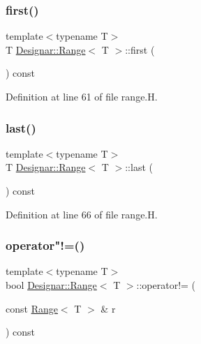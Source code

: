 \subsubsection{\texorpdfstring{first()}{first()}}
{\footnotesize\ttfamily template$<$typename T$>$ \\
T \hyperlink{class_designar_1_1_range}{Designar\+::\+Range}$<$ T $>$\+::first (\begin{DoxyParamCaption}{ }\end{DoxyParamCaption}) const\hspace{0.3cm}{\ttfamily [inline]}}



Definition at line 61 of file range.\+H.

\mbox{\label{class_designar_1_1_range_abe2839675b48ab64073c2e74976523c7}} 
\subsubsection{\texorpdfstring{last()}{last()}}
{\footnotesize\ttfamily template$<$typename T$>$ \\
T \hyperlink{class_designar_1_1_range}{Designar\+::\+Range}$<$ T $>$\+::last (\begin{DoxyParamCaption}{ }\end{DoxyParamCaption}) const\hspace{0.3cm}{\ttfamily [inline]}}



Definition at line 66 of file range.\+H.

\mbox{\label{class_designar_1_1_range_a736b540580449acc24fd57d4fa51897e}} 
\subsubsection{\texorpdfstring{operator"!=()}{operator!=()}}
{\footnotesize\ttfamily template$<$typename T$>$ \\
bool \hyperlink{class_designar_1_1_range}{Designar\+::\+Range}$<$ T $>$\+::operator!= (\begin{DoxyParamCaption}\item[{const \hyperlink{class_designar_1_1_range}{Range}$<$ T $>$ \&}]{r }\end{DoxyParamCaption}) const\hspace{0.3cm}{\ttfamily [inline]}}




